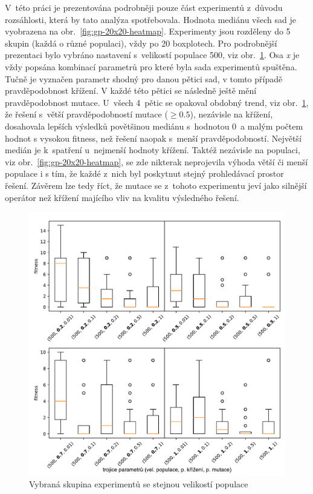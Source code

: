 V~této práci je prezentována podrobněji pouze část experimentů z~důvodu rozsáhlosti, která by tato analýza spotřebovala. Hodnota mediánu všech sad je vyobrazena na obr.~\ref{fig:gp-20x20-heatmap}. Experimenty jsou rozděleny do 5 skupin (každá o různé populaci), vždy po 20 boxplotech. Pro podrobnější prezentaci bylo vybráno nastavení s~velikostí populace 500, viz obr.~\ref{fig:exp-tgp-20x20-pop500.pdf}. Osa \emph{x} je vždy popsána  kombinací parametrů pro které byla sada experimentů spuštěna. Tučně je vyznačen parametr shodný pro danou pětici sad, v tomto případě pravděpodobnost křížení. V každé této pětici se následně ještě mění pravděpodobnost mutace. U~všech 4~pětic se opakoval obdobný trend, viz obr.~\ref{fig:exp-tgp-20x20-pop500.pdf}, že řešení s~větší pravděpodobností mutace ($\geq 0.5$), nezávisle na křížení, dosahovala lepších výsledků povětšinou mediánu s~hodnotou 0~a malým počtem hodnot s vysokou fitness, než řešení naopak s~menší pravděpodobností. Největší medián je k~spatření u~nejmenší hodnoty křížení. Taktéž nezávisle na populaci, viz obr.~\ref{fig:gp-20x20-heatmap}, se zde nikterak neprojevila výhoda větší či menší populace i s tím, že každé z~nich byl poskytnut stejný prohledávací prostor řešení. Závěrem lze tedy říct,  že mutace se z~tohoto experimentu jeví jako silnější operátor než křížení majícího vliv na kvalitu výsledného řešení.

\bigskip
\bigskip
\bigskip

\begin{figure}[!h]
    \centering
    \includegraphics[scale=0.7]{obrazky-figures/exp-tgp-20x20-pop500.pdf}
    \caption{Vybraná skupina experimentů se stejnou velikostí populace}
    \label{fig:exp-tgp-20x20-pop500.pdf}
\end{figure} 


